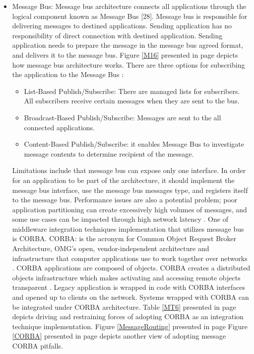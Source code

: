 \documentclass[12pt,a4paper,final,twoside,onecolumn,titlepage]{book}
\begin{document}
\begin{itemize}
\begin{itemize}
\item Message Bus: Message bus architecture connects all applications through the logical component known as Message Bus [28]. Message bus is responsible for delivering messages to destined applications. Sending application has no responsibility of direct connection with destined application. Sending application needs to prepare the message in the message bus agreed format, and delivers it to the message bus. Figure \ref{M16} presented in page \pageref{M16} depicts how message bus architecture works. There are three options for subscribing the application to the Message Bus \cite{M52}:
\begin{itemize}
\item List-Based Publish/Subscribe: There are managed lists for subscribers. All subscribers receive certain messages when they are sent to the bus.
\item Broadcast-Based Publish/Subscribe: Messages are sent to the all connected applications.
\item Content-Based Publish/Subscribe: it enables Message Bus to investigate message contents to determine recipient of the message.
\end{itemize}
Limitations include that message bus can expose only one interface. In order for an application to be part of the architecture, it should implement the message bus interface, use the message bus messages type, and registers itself to the message bus. Performance issues are also a potential problem; poor application partitioning can create excessively high volumes of messages, and some use cases can be impacted through high network latency \cite{M53}. One of middleware integration techniques implementation that utilizes message bus is \gls{CORBA}. \gls{CORBA}: is the acronym for Common Object Request Broker Architecture, OMG's open, vendor-independent architecture and infrastructure that computer applications use to work together over networks \cite{M54}. \gls{CORBA} applications are composed of objects. \gls{CORBA} creates a distributed objects infrastructure which makes activating and accessing remote objects transparent \cite{M55}. Legacy application is wrapped in code with \gls{CORBA} interfaces and opened up to clients on the network. Systems wrapped with \gls{CORBA} can be integrated under \gls{CORBA} architecture. Table \ref{MT6} presented in page \pageref{MT6} depicts driving and restraining forces of adopting \gls{CORBA} as an integration technique implementation. Figure \ref{MessageRouting} presented in page  Figure \ref{CORBA} presented in page \pageref{CORBA} depicts another view of adopting message CORBA pitfalls.

\end{itemize}
\end{itemize}
\end{document}
